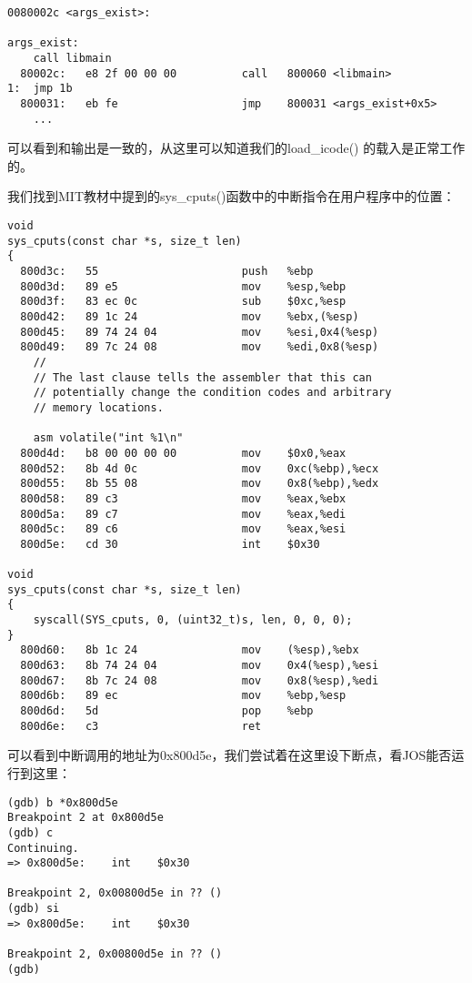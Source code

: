 \documentclass{article}
\newcommand{\funcname}[1]{{\ttfamily \small #1}}
\begin{document}
\begin{CJK*}{UTF8}{gkai}
\begin{lstlisting}[style=acode, firstnumber=5, title={\scriptsize \ttfamily \bfseries obj/user/hello.asm}]
0080002c <args_exist>:

args_exist:
	call libmain
  80002c:	e8 2f 00 00 00       	call   800060 <libmain>
1:	jmp 1b
  800031:	eb fe                	jmp    800031 <args_exist+0x5>
	...
\end{lstlisting}

可以看到和输出是一致的，从这里可以知道我们的\funcname{load\_icode()} 的载入是正常工作的。

我们找到MIT教材中提到的\funcname{sys\_cputs()}函数中的中断指令在用户程序中的位置：

\begin{lstlisting}[style=acode, firstnumber=2074, title={\scriptsize \ttfamily \bfseries obj/user/hello.asm}]
void
sys_cputs(const char *s, size_t len)
{
  800d3c:	55                   	push   %ebp
  800d3d:	89 e5                	mov    %esp,%ebp
  800d3f:	83 ec 0c             	sub    $0xc,%esp
  800d42:	89 1c 24             	mov    %ebx,(%esp)
  800d45:	89 74 24 04          	mov    %esi,0x4(%esp)
  800d49:	89 7c 24 08          	mov    %edi,0x8(%esp)
	// 
	// The last clause tells the assembler that this can
	// potentially change the condition codes and arbitrary
	// memory locations.

	asm volatile("int %1\n"
  800d4d:	b8 00 00 00 00       	mov    $0x0,%eax
  800d52:	8b 4d 0c             	mov    0xc(%ebp),%ecx
  800d55:	8b 55 08             	mov    0x8(%ebp),%edx
  800d58:	89 c3                	mov    %eax,%ebx
  800d5a:	89 c7                	mov    %eax,%edi
  800d5c:	89 c6                	mov    %eax,%esi
  800d5e:	cd 30                	int    $0x30

void
sys_cputs(const char *s, size_t len)
{
	syscall(SYS_cputs, 0, (uint32_t)s, len, 0, 0, 0);
}
  800d60:	8b 1c 24             	mov    (%esp),%ebx
  800d63:	8b 74 24 04          	mov    0x4(%esp),%esi
  800d67:	8b 7c 24 08          	mov    0x8(%esp),%edi
  800d6b:	89 ec                	mov    %ebp,%esp
  800d6d:	5d                   	pop    %ebp
  800d6e:	c3                   	ret    
\end{lstlisting}

可以看到中断调用的地址为0x800d5e，我们尝试着在这里设下断点，看JOS能否运行到这里：

\begin{lstlisting}[style=console]
(gdb) b *0x800d5e
Breakpoint 2 at 0x800d5e
(gdb) c
Continuing.
=> 0x800d5e:	int    $0x30

Breakpoint 2, 0x00800d5e in ?? ()
(gdb) si
=> 0x800d5e:	int    $0x30

Breakpoint 2, 0x00800d5e in ?? ()
(gdb) 
\end{lstlisting}


\end{CJK*}
\end{document}
